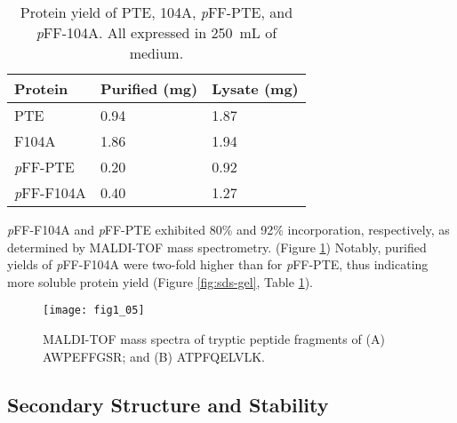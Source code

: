\begin{refsection}
\begin{table}[htbp]
\centering
\begin{tabular}{ lll }
  \hline
  Protein & Purified (mg) & Lysate (mg) \\
  \hline
  PTE & 0.94 & 1.87  \\
  F104A & 1.86 & 1.94  \\
  \emph{p}FF-PTE & 0.20 & 0.92  \\
  \emph{p}FF-F104A & 0.40 & 1.27  \\
  \hline

\end{tabular}
\caption[Protein yield of PTE, 104A, \emph{p}FF-PTE, and \emph{p}FF-104A. All
expressed in \SI{250}{\mL} of medium.]{Protein yield of PTE, 104A,
    \emph{p}FF-PTE, and \emph{p}FF-104A. All expressed in \SI{250}{\mL} of
medium.} 
    \label{tab:protein-yield} 
\end{table}

\emph{p}FF-F104A and \emph{p}FF-PTE exhibited 80\% and 92\%
incorporation, respectively, as determined by MALDI-TOF
mass spectrometry. (Figure \ref{fig:MALDI-fig}) Notably, purified yields of
\emph{p}FF-F104A were two-fold higher than for \emph{p}FF-PTE, thus indicating
more soluble protein yield (Figure \ref{fig:sds-gel}, Table
\ref{tab:protein-yield}).
\begin{figure}[htbp] \centering \texttt{[image: fig1\_05]}
    \caption[MALDI-TOF mass spectra of tryptic peptide fragments of (A)
    AWPEFFGSR; and (B) ATPFQELVLK.]{MALDI-TOF mass spectra of tryptic peptide
    fragments of (A) AWPEFFGSR; and (B) ATPFQELVLK.}
    \label{fig:MALDI-fig}
\end{figure}

\subsection{Secondary Structure and Stability}


\end{refsection}
